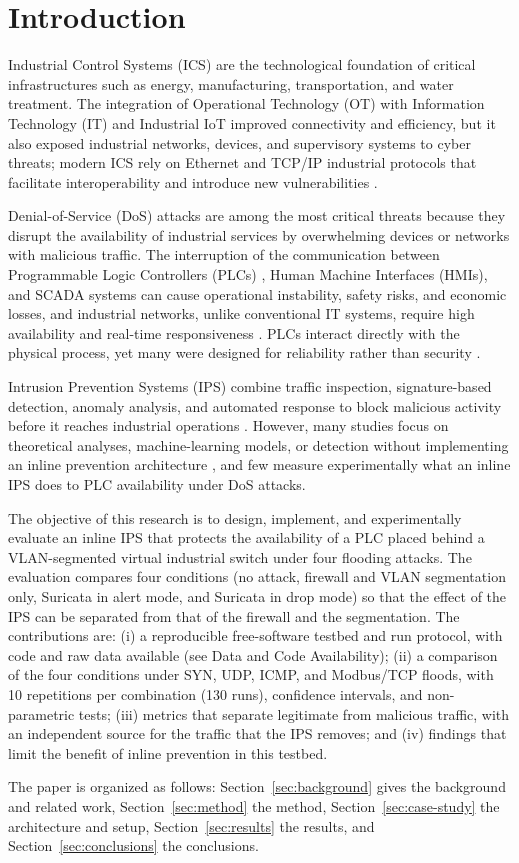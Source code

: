 \section{Introduction}\label{sec:introduction}
Industrial Control Systems (ICS) are the technological foundation of critical infrastructures such as energy, manufacturing, transportation, and water treatment. The integration of Operational Technology (OT) with Information Technology (IT) and Industrial IoT improved connectivity and efficiency, but it also exposed industrial networks, devices, and supervisory systems to cyber threats; modern ICS rely on Ethernet and TCP/IP industrial protocols that facilitate interoperability and introduce new vulnerabilities \cite{Gillen2020ICS,Tama2022IDS}.

Denial-of-Service (DoS) attacks are among the most critical threats because they disrupt the availability of industrial services by overwhelming devices or networks with malicious traffic. The interruption of the communication between Programmable Logic Controllers (PLCs) \cite{Raman2021ICS}, Human Machine Interfaces (HMIs), and SCADA systems can cause operational instability, safety risks, and economic losses, and industrial networks, unlike conventional IT systems, require high availability and real-time responsiveness \cite{Benka2025ICS}. PLCs interact directly with the physical process, yet many were designed for reliability rather than security \cite{Yu2019IDS}.

Intrusion Prevention Systems (IPS) combine traffic inspection, signature-based detection, anomaly analysis, and automated response to block malicious activity before it reaches industrial operations \cite{Tama2022IDS,Varghese2022DigitalTwinIDS}. However, many studies focus on theoretical analyses, machine-learning models, or detection without implementing an inline prevention architecture \cite{Makrakis2021ICS,Bhamare2020ICS}, and few measure experimentally what an inline IPS does to PLC availability under DoS attacks.

The objective of this research is to design, implement, and experimentally evaluate an inline IPS that protects the availability of a PLC placed behind a VLAN-segmented virtual industrial switch under four flooding attacks. The evaluation compares four conditions (no attack, firewall and VLAN segmentation only, Suricata in alert mode, and Suricata in drop mode) so that the effect of the IPS can be separated from that of the firewall and the segmentation. The contributions are: (i) a reproducible free-software testbed and run protocol, with code and raw data available (see Data and Code Availability); (ii) a comparison of the four conditions under SYN, UDP, ICMP, and Modbus/TCP floods, with 10 repetitions per combination (130 runs), confidence intervals, and non-parametric tests; (iii) metrics that separate legitimate from malicious traffic, with an independent source for the traffic that the IPS removes; and (iv) findings that limit the benefit of inline prevention in this testbed.

The paper is organized as follows: Section~\ref{sec:background} gives the background and related work, Section~\ref{sec:method} the method, Section~\ref{sec:case-study} the architecture and setup, Section~\ref{sec:results} the results, and Section~\ref{sec:conclusions} the conclusions.
